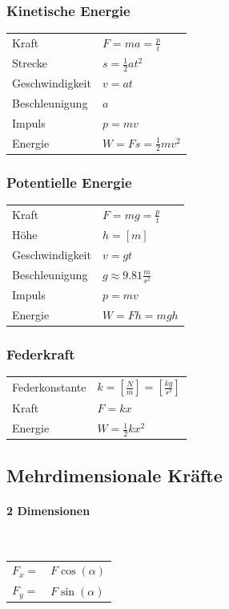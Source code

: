 \documentclass[a4paper]{scrartcl}
\begin{document}
\subsubsection{Kinetische Energie}
	\begin{tabu} {l X}
		Kraft & $F = ma = \frac{p}{t}$ \\
		Strecke & $s = \frac{1}{2} a t^2$ \\
		Geschwindigkeit & $v = at$ \\
		Beschleunigung & $a$\\
		Impuls & $p = mv$ \\
		Energie & $W = Fs = \frac{1}{2} mv^2$
	\end{tabu}

\subsubsection{Potentielle Energie}
	
	\begin{tabu} {l X}
		Kraft & $F = mg = \frac{p}{t}$ \\
		Höhe & $h = \left[ m \right]$ \\
		Geschwindigkeit & $v = gt$ \\
		Beschleunigung & $g \approx 9.81 \frac{m}{s^2}$ \\
		Impuls & $p = mv$ \\
		Energie & $W = Fh = mgh$
	\end{tabu}

\subsubsection{Federkraft}

	
	\begin{tabu} {l X}
		Federkonstante & $k = \left[ \frac{N}{m} \right] = \left[ \frac{kg}{s^2} \right]$ \\
		Kraft & $F = kx$ \\ %
		Energie & $	W = \frac{1}{2} k x^2$
	\end{tabu}


\subsection{Mehrdimensionale Kräfte}
\paragraph{2 Dimensionen} \hfill \\
	\begin{tabu} {l X}
		$F_x = $ & $F\cos(\alpha)$ \\
		$F_y = $ & $F\sin(\alpha)$ \\
	\end{tabu}
\end{document}
